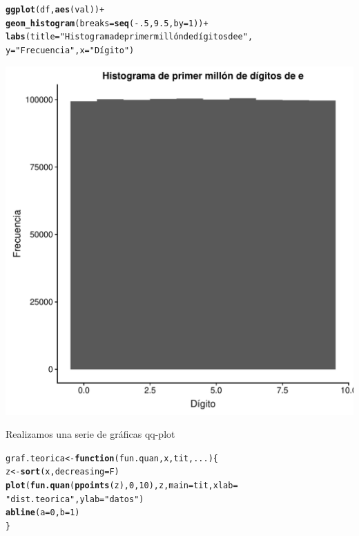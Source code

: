 \documentclass[12 pt]{article}\usepackage[]{graphicx}\usepackage[]{color}
\makeatletter
\def\maxwidth{ %
  \ifdim\Gin@nat@width>\linewidth
    \linewidth
  \else
    \Gin@nat@width
  \fi
}
\newcommand{\hlnum}[1]{\textcolor[rgb]{0.686,0.059,0.569}{#1}}%
\newcommand{\hlstr}[1]{\textcolor[rgb]{0.192,0.494,0.8}{#1}}%
\newcommand{\hlopt}[1]{\textcolor[rgb]{0,0,0}{#1}}%
\newcommand{\hlstd}[1]{\textcolor[rgb]{0.345,0.345,0.345}{#1}}%
\newcommand{\hlkwa}[1]{\textcolor[rgb]{0.161,0.373,0.58}{\textbf{#1}}}%
\newcommand{\hlkwb}[1]{\textcolor[rgb]{0.69,0.353,0.396}{#1}}%
\newcommand{\hlkwc}[1]{\textcolor[rgb]{0.333,0.667,0.333}{#1}}%
\newcommand{\hlkwd}[1]{\textcolor[rgb]{0.737,0.353,0.396}{\textbf{#1}}}%
\newenvironment{kframe}{%
 \def\at@end@of@kframe{}%
 \ifinner\ifhmode%
  \def\at@end@of@kframe{\end{minipage}}%
  \begin{minipage}{\columnwidth}%
 \fi\fi%
 \def\FrameCommand##1{\hskip\@totalleftmargin \hskip-\fboxsep
 \colorbox{shadecolor}{##1}\hskip-\fboxsep
     \hskip-\linewidth \hskip-\@totalleftmargin \hskip\columnwidth}%
 \MakeFramed {\advance\hsize-\width
   \@totalleftmargin\z@ \linewidth\hsize
   \@setminipage}}%
 {\par\unskip\endMakeFramed%
 \at@end@of@kframe}
\newenvironment{knitrout}{}{} %
\makeatother
\begin{document}
\begin{enumerate}
\begin{knitrout}
\color{fgcolor}\begin{kframe}
\begin{alltt}
\hlkwd{ggplot}\hlstd{(df,} \hlkwd{aes}\hlstd{(val))} \hlopt{+}
    \hlkwd{geom_histogram}\hlstd{(}\hlkwc{breaks} \hlstd{=} \hlkwd{seq}\hlstd{(}\hlopt{-}\hlnum{.5}\hlstd{,}\hlnum{9.5}\hlstd{,}\hlkwc{by} \hlstd{=} \hlnum{1}\hlstd{))} \hlopt{+}
    \hlkwd{labs}\hlstd{(}\hlkwc{title}\hlstd{=}\hlstr{"Histograma de primer millón de dígitos de e"}\hlstd{,}
    \hlkwc{y}\hlstd{=}\hlstr{"Frecuencia"}\hlstd{,} \hlkwc{x}\hlstd{=}\hlstr{"Dígito"}\hlstd{)}
\end{alltt}
\end{kframe}
\includegraphics[width=\maxwidth]{figure/unnamed-chunk-14-1} 

\end{knitrout}

Realizamos una serie de gráficas qq-plot 

\begin{knitrout}
\color{fgcolor}\begin{kframe}
\begin{alltt}
\hlstd{graf.teorica} \hlkwb{<-} \hlkwa{function}\hlstd{(}\hlkwc{fun.quan}\hlstd{,}\hlkwc{x}\hlstd{,}\hlkwc{tit}\hlstd{,}\hlkwc{...}\hlstd{)\{}
    \hlstd{z} \hlkwb{<-} \hlkwd{sort}\hlstd{(x,}\hlkwc{decreasing}\hlstd{=F)}
    \hlkwd{plot}\hlstd{(}\hlkwd{fun.quan}\hlstd{(}\hlkwd{ppoints}\hlstd{(z),}\hlnum{0}\hlstd{,}\hlnum{10}\hlstd{),z,}\hlkwc{main}\hlstd{=tit,}\hlkwc{xlab} \hlstd{=}
    \hlstr{"dist. teorica"}\hlstd{,}\hlkwc{ylab} \hlstd{=} \hlstr{"datos"}\hlstd{)}
    \hlkwd{abline}\hlstd{(}\hlkwc{a}\hlstd{=}\hlnum{0}\hlstd{,}\hlkwc{b}\hlstd{=}\hlnum{1}\hlstd{)}
\hlstd{\}}


\end{alltt}
\end{kframe}
\end{knitrout}
\end{enumerate}
\end{document}
